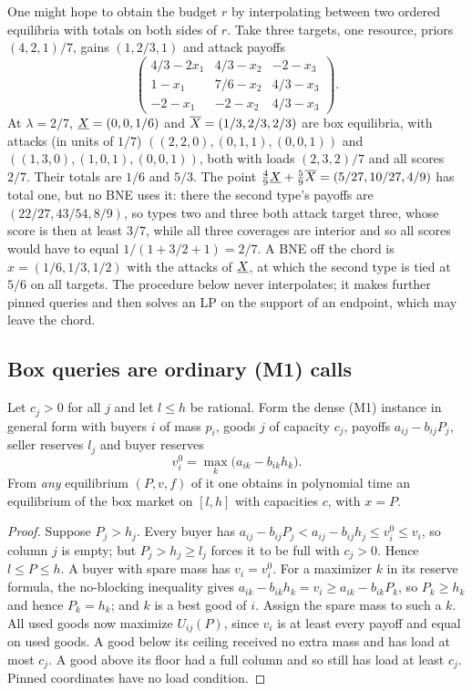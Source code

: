 \begin{example}\label{ex:mk-interp}
One might hope to obtain the budget $r$ by interpolating between two ordered equilibria with totals
on both sides of $r$. Take three targets, one resource, priors $(4,2,1)/7$, gains $(1,2/3,1)$ and attack
payoffs
\[
\begin{pmatrix}
4/3-2x_1&4/3-x_2&-2-x_3\\
1-x_1&7/6-x_2&4/3-x_3\\
-2-x_1&-2-x_2&4/3-x_3
\end{pmatrix}.
\]
At $\lambda=2/7$, $\underline{X}{}=(0,0,1/6)$ and $\overline{X}{}=(1/3,2/3,2/3)$ are box equilibria, with attacks (in units of
$1/7$) $((2,2,0),(0,1,1),(0,0,1))$ and $((1,3,0),(1,0,1),(0,0,1))$, both with loads $(2,3,2)/7$ and all
scores $2/7$. Their totals are $1/6$ and $5/3$. The point $\tfrac49\underline{X}{}+\tfrac59\overline{X}{}=(5/27,10/27,4/9)$ has
total one, but no BNE uses it: there the second type's payoffs are $(22/27,43/54,8/9)$, so types two and
three both attack target three, whose score is then at least $3/7$, while all three coverages are
interior and so all scores would have to equal $1/(1+3/2+1)=2/7$. A BNE off the chord is
$x=(1/6,1/3,1/2)$ with the attacks of $\underline{X}{}$, at which the second type is tied at $5/6$ on all targets. The
procedure below never interpolates; it makes further pinned queries and then solves an LP on the
support of an endpoint, which may leave the chord.
\end{example}

\subsection{Box queries are ordinary (M1) calls}

\begin{lemma}\label{lem:mk-box-m1}
Let $c_j>0$ for all $j$ and let $l\le h$ be rational. Form the dense (M1) instance in general form with
buyers $i$ of mass $p_i$, goods $j$ of capacity $c_j$, payoffs $a_{ij}-b_{ij}P_j$, seller reserves $l_j$
and buyer reserves
\[
v_i^0=\max_k\bigl(a_{ik}-b_{ik}h_k\bigr).
\]
From \emph{any} equilibrium $(P,v,f)$ of it one obtains in polynomial time an equilibrium of the box
market on $[l,h]$ with capacities $c$, with $x=P$.
\end{lemma}

\begin{proof}
Suppose $P_j>h_j$. Every buyer has $a_{ij}-b_{ij}P_j<a_{ij}-b_{ij}h_j\le v_i^0\le v_i$, so column $j$ is
empty; but $P_j>h_j\ge l_j$ forces it to be full with $c_j>0$. Hence $l\le P\le h$. A buyer with spare
mass has $v_i=v_i^0$. For a maximizer $k$ in its reserve formula, the no-blocking inequality gives
$a_{ik}-b_{ik}h_k=v_i\ge a_{ik}-b_{ik}P_k$, so $P_k\ge h_k$ and hence $P_k=h_k$; and $k$ is a best good of
$i$. Assign the spare mass to such a $k$. All used goods now maximize $U_{ij}(P)$, since $v_i$ is at
least every payoff and equal on used goods. A good below its ceiling received no extra mass and has
load at most $c_j$. A good above its floor had a full column and so still has load at least $c_j$.
Pinned coordinates have no load condition.
\end{proof}

